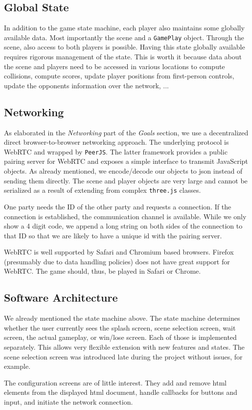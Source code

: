 \documentclass[11pt]{article}
\begin{document}
\subsection{Global State}
\par In addition to the game state machine, each player also maintains some globally available data. Most importantly the scene and a \texttt{GamePlay} object. Through the scene, also access to both players is possible. Having this state globally available requires rigorous management of the state. This is worth it because data about the scene and players need to be accessed in various locations to compute collisions, compute scores, update player positions from first-person controls, update the opponents information over the network, ...

\subsection{Networking}
\par As elaborated in the \textit{Networking} part of the \textit{Goals} section, we use a decentralized direct browser-to-browser networking approach. The underlying protocol is WebRTC and wrapped by \texttt{PeerJS}. The latter framework provides a public pairing server for WebRTC and exposes a simple interface to transmit JavaScript objects. As already mentioned, we encode/decode our objects to json instead of sending them directly. The scene and player objects are very large and cannot be serialized as a result of extending from complex \texttt{three.js} classes.
\par One party needs the ID of the other party and requests a connection. If the connection is established, the communication channel is available. While we only show a 4 digit code, we append a long string on both sides of the connection to that ID so that we are likely to have a unique id with the pairing server.
\par WebRTC is well supported by Safari and Chromium based browsers. Firefox (presumably due to data handling policies) does not have great support for WebRTC. The game should, thus, be played in Safari or Chrome.

\subsection{Software Architecture}
\par We already mentioned the state machine above. The state machine determines whether the user currently sees the splash screen, scene selection screen, wait screen, the actual gameplay, or win/lose screen. Each of those is implemented separately. This allows very flexible extension with new features and states. The scene selection screen was introduced late during the project without issues, for example.
\par The configuration screens are of little interest. They add and remove html elements from the displayed html document, handle callbacks for buttons and input, and initiate the network connection.
\end{document}
